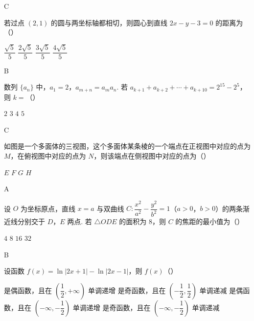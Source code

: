 \begin{answer}
C
\end{answer}

\begin{problem}
若过点 \((2,1)\) 的圆与两坐标轴都相切，则圆心到直线 \(2x-y-3=0\) 的距离为（\quad）

\choices
    {\(\dfrac{\sqrt5}{5}\)}
    {\(\dfrac{2\sqrt5}{5}\)}
    {\(\dfrac{3\sqrt5}{5}\)}
    {\(\dfrac{4\sqrt5}{5}\)}
\end{problem}

\begin{answer}
B
\end{answer}

\begin{problem}
数列 \(\{a_n\}\) 中，\(a_1=2\)，\(a_{m+n}=a_m a_n\). 若 \(a_{k+1}+a_{k+2}+\cdots+a_{k+10}=2^{15}-2^5\)，则 \(k=\)（\quad）

\choices
    {\(2\)}
    {\(3\)}
    {\(4\)}
    {\(5\)}
\end{problem}

\begin{answer}
C
\end{answer}

\begin{problem}
如图是一个多面体的三视图，这个多面体某条棱的一个端点在正视图中对应的点为 \(M\)，在俯视图中对应的点为 \(N\)，则该端点在侧视图中对应的点为（\quad）


\choices
    {\(E\)}
    {\(F\)}
    {\(G\)}
    {\(H\)}
\end{problem}

\begin{answer}
A
\end{answer}

\begin{problem}
设 \(O\) 为坐标原点，直线 \(x=a\) 与双曲线 \(C:\dfrac{x^2}{a^2}-\dfrac{y^2}{b^2}=1\)（\(a>0\)，\(b>0\)）的两条渐近线分别交于 \(D\)，\(E\) 两点. 若 \(\triangle ODE\) 的面积为 \(8\)，则 \(C\) 的焦距的最小值为（\quad）

\choices
    {\(4\)}
    {\(8\)}
    {\(16\)}
    {\(32\)}
\end{problem}

\begin{answer}
B
\end{answer}

\begin{problem}
设函数 \(f(x)=\ln |2x+1|-\ln |2x-1|\)，则 \(f(x)\)（\quad）

\choices
    {是偶函数，且在 \(\left( \dfrac{1}{2},+\infty \right)\) 单调递增}
    {是奇函数，且在 \(\left( -\dfrac{1}{2},\dfrac{1}{2} \right)\) 单调递减}
    {是偶函数，且在 \(\left( -\infty,-\dfrac{1}{2} \right)\) 单调递增}
    {是奇函数，且在 \(\left( -\infty,-\dfrac{1}{2} \right)\) 单调递减}
\end{problem}

